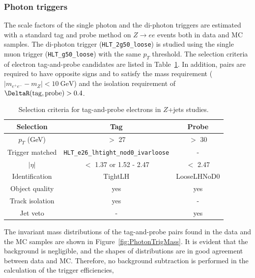 \subsubsection{Photon triggers}
\label{subsect:photonTrigEff}

The scale factors of the single photon and the di-photon triggers are estimated with a standard tag and probe method on $Z\rightarrow ee$ events both in data and MC samples. The di-photon trigger (\texttt{HLT\_2g50\_loose}) is studied using the single muon trigger (\texttt{HLT\_g50\_loose}) with the same $p_{T}$ threshold. The selection criteria of electron tag-and-probe candidates are listed in Table~\ref{tab:ZeeSelection}. In addition, pairs are required to have opposite signs and to satisfy the mass requirement ($|m_{e^{+}e^{-}} - m_{Z}| < 10~\si{\GeV}$) and the isolation requirement of $\DeltaR(\mathrm{tag}, \mathrm{probe}) > 0.4$. 

\begin{table}[!htb]
	\centering
	\begin{tabular}{ccc}
		\hline
		\hline
		Selection               & Tag                                           & Probe         \\
		\hline
		$p_{T}$ (GeV)           & $>$ 27                                        & $>$ 30        \\
		Trigger matched         & \texttt{HLT\_e26\_lhtight\_nod0\_ivarloose}   & -             \\
		$|\eta|$                & $<$ 1.37 or 1.52 - 2.47                       & $<$ 2.47      \\
		Identification          & TightLH                                       & LooseLHNoD0   \\
		Object quality          & yes                                           & yes           \\
		Track isolation         & yes                                           & -             \\
		Jet veto                & -                                             & yes           \\
		\hline
		\hline
	\end{tabular}
	\caption{Selection criteria for tag-and-probe electrons in $Z$+jets studies.}
	\label{tab:ZeeSelection}
\end{table}

The invariant mass distributions of the tag-and-probe pairs found in the data and the MC samples are shown in Figure~\ref{fig:PhotonTrigMass}. It is evident that the background is negligible, and the shapes of distributions are in good agreement between data and MC. Therefore, no background subtraction is performed in the calculation of the trigger efficiencies, 

